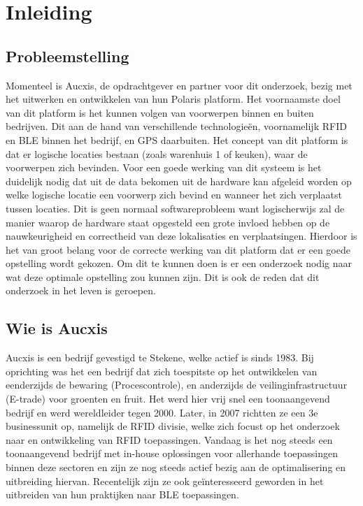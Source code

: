 
\chapter{Inleiding}
\label{ch:inleiding}

\section{Probleemstelling}
\label{sec:probleemstelling}

Momenteel is Aucxis, de opdrachtgever en partner voor dit onderzoek, bezig met het uitwerken en ontwikkelen van hun Polaris platform. Het voornaamste doel van dit platform is het kunnen volgen van voorwerpen binnen en buiten bedrijven. Dit aan de hand van verschillende technologieën, voornamelijk RFID en BLE binnen het bedrijf, en GPS daarbuiten. 
Het concept van dit platform is dat er logische locaties bestaan (zoals warenhuis 1 of keuken), waar de voorwerpen zich bevinden. Voor een goede werking van dit systeem is het duidelijk nodig dat uit de data bekomen uit de hardware kan afgeleid worden op welke logische locatie een voorwerp zich bevind en wanneer het zich verplaatst tussen locaties. Dit is geen normaal softwareprobleem want logischerwijs zal de manier waarop de hardware staat opgesteld een grote invloed hebben op de nauwkeurigheid en correctheid van deze lokalisaties en verplaatsingen. Hierdoor is het van groot belang voor de correcte werking van dit platform dat er een goede opstelling wordt gekozen. Om dit te kunnen doen is er een onderzoek nodig naar wat deze optimale opstelling zou kunnen zijn. Dit is ook de reden dat dit onderzoek in het leven is geroepen.

\section{Wie is Aucxis}
\label{sec:wie-is-aucxis}
Aucxis is een bedrijf gevestigd te Stekene, welke actief is sinds 1983. Bij oprichting was het een bedrijf dat zich toespitste op het ontwikkelen van eenderzijds de bewaring (Procescontrole), en anderzijds de veilinginfrastructuur (E-trade) voor groenten en fruit. Het werd hier vrij snel een toonaangevend bedrijf en werd wereldleider tegen 2000. Later, in 2007 richtten ze een 3e businessunit op, namelijk de RFID divisie, welke zich focust op het onderzoek naar en ontwikkeling van RFID toepassingen. Vandaag is het nog steeds een toonaangevend bedrijf met in-house oplossingen voor allerhande toepassingen binnen deze sectoren en zijn ze nog steeds actief bezig aan de optimalisering en uitbreiding hiervan. Recentelijk zijn ze ook geïnteresseerd geworden in het uitbreiden van hun praktijken naar BLE toepassingen.\autocite{Aucxis2020}

